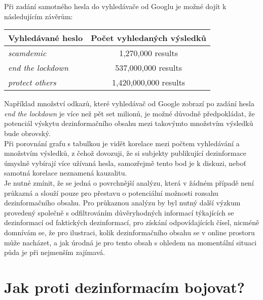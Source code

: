 Při zadání samotného hesla do vyhledávače od Googlu je možné dojít k následujícím závěrům:\\

\begin{centering}
\begin{tabular}{l|c}
 \textbf{Vyhledávané heslo} & \textbf{Počet vyhledaných výsledků} \\ 
\hline
\hline
 \textit{scamdemic} & 1,270,000 results \\  
 \textit{end the lockdown} & 537,000,000 results \\
 \textit{protect others} & 1,420,000,000 results \\
\hline
\hline    
\end{tabular}
  \label{tbl:odkaz}
\end{centering}
\vspace*{5mm}

Například množství odkazů, které vyhledávač od Google zobrazí po zadání hesla \textit{end the lockdown} je více než pět set milionů, je možné důvodně předpokládat, že potenciál výskytu dezinformačního obsahu mezi takovýmto množstvím výsledků bude obrovský.\\

Při porovnání grafu s tabulkou je vidět korelace mezi počtem vyhledávání a množstvím výsledků, z čehož dovozuji, že si subjekty publikující dezinformace úmyslně vybírají více užívaná hesla, samozřejmě tento bod je k diskuzi, neboť samotná korelace neznamená kauzalitu.\\

Je nutné zmínit, že se jedná o povrchnější analýzu, která v žádném případě není průkazná a slouží pouze pro přestavu o potenciální možnosti rozsahu dezinformačního obsahu. Pro průkaznou analýzu by byl nutný další výzkum provedený společně s odfiltrováním důvěryhodných informací týkajících se dezinformací od faktických dezinformací, pro získání odpovídajících čísel, nicméně domnívám se, že pro ilustraci, kolik dezinformačního obsahu se v online prostoru může nacházet, a jak úrodná je pro tento obsah s ohledem na momentální situaci půda je při nejmenším zajímavá.\\

\newpage

\section{Jak proti dezinformacím bojovat?}

